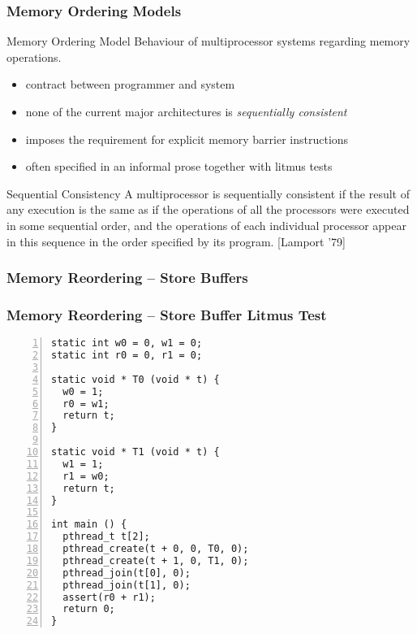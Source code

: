 \documentclass{beamer}
\begin{document}
\begin{frame}
  \frametitle{Memory Ordering Models}

  \begin{textbox}{Memory Ordering Model}
    Behaviour of multiprocessor systems regarding memory operations.
  \end{textbox}

  \begin{itemize}
    \item contract between programmer and system
    \item none of the current major architectures is \emph{sequentially consistent}
    \item imposes the requirement for explicit memory barrier instructions
    \item often specified in an informal prose together with litmus tests
  \end{itemize}

  \begin{textbox}{Sequential Consistency}
    \scriptsize
    A multiprocessor is sequentially consistent if the result of any execution is the same as if the operations of all the processors were executed in some sequential order, and the operations of each individual processor appear in this sequence in the order specified by its program. \tiny [Lamport '79]
  \end{textbox}
\end{frame}

\begin{frame}
  \frametitle{Memory Reordering -- Store Buffers}
  \centering
  \hspace{-.4cm}
  \scalebox{.7}{}
\end{frame}

\begin{frame}[fragile]
  \frametitle{Memory Reordering -- Store Buffer Litmus Test}
  \begin{lstlisting}[style=c++, numbers=left, numberstyle=\tiny\color{gray}, numberblanklines=false]
static int w0 = 0, w1 = 0;
static int r0 = 0, r1 = 0;

static void * T0 (void * t) {
  w0 = 1;
  r0 = w1;
  return t;
}

static void * T1 (void * t) {
  w1 = 1;
  r1 = w0;
  return t;
}

int main () {
  pthread_t t[2];
  pthread_create(t + 0, 0, T0, 0);
  pthread_create(t + 1, 0, T1, 0);
  pthread_join(t[0], 0);
  pthread_join(t[1], 0);
  assert(r0 + r1);
  return 0;
}
  \end{lstlisting}
\end{frame}
\end{document}
